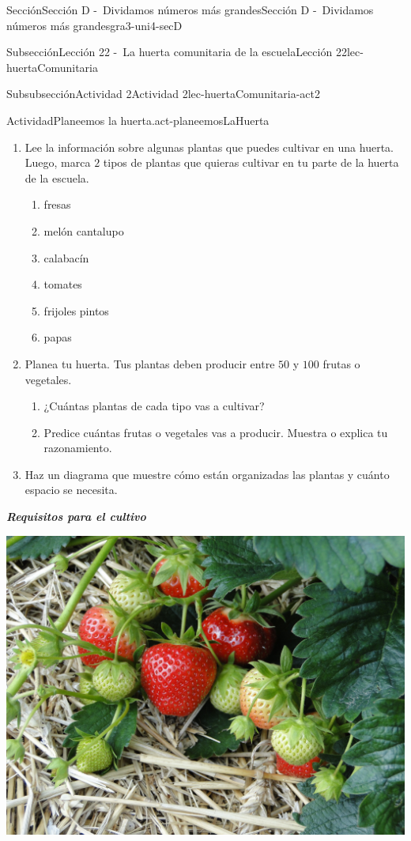 \documentclass[twoside,10pt,]{article}
\newcommand{\alert}[1]{\textbf{\textit{#1}}}
\begin{document}
\begin{sectionptx}{Sección}{Sección D -~Dividamos números más grandes}{}{Sección D -~Dividamos números más grandes}{}{}{gra3-uni4-secD}
\begin{subsectionptx}{Subsección}{Lección 22 -~La huerta comunitaria de la escuela}{}{Lección 22}{}{}{lec-huertaComunitaria}
\begin{subsubsectionptx}{Subsubsección}{Actividad 2}{}{Actividad 2}{}{}{lec-huertaComunitaria-act2}
\begin{activity}{Actividad}{Planeemos la huerta.}{act-planeemosLaHuerta}%
%
\begin{enumerate}
\item{}Lee la información sobre algunas plantas que puedes cultivar en una huerta. Luego, marca \(2\) tipos de plantas que quieras cultivar en tu parte de la huerta de la escuela.%
%
\begin{enumerate}
\item{}fresas%
\item{}melón cantalupo%
\item{}calabacín%
\item{}tomates%
\item{}frijoles pintos%
\item{}papas%
\end{enumerate}
\item{}Planea tu huerta. Tus plantas deben producir entre \(50\) y \(100\) frutas o vegetales.%
%
\begin{enumerate}
\item{}¿Cuántas plantas de cada tipo vas a cultivar?%
\item{}Predice cuántas frutas o vegetales vas a producir. Muestra o explica tu razonamiento.%
\end{enumerate}
\item{}Haz un diagrama que muestre cómo están organizadas las plantas y cuánto espacio se necesita.%
\end{enumerate}
\alert{Requisitos para el cultivo}%
\begin{sidebyside}{2}{0.025}{0.025}{0.05}%
\begin{sbspanel}{0.45}%
\includegraphics[width=\linewidth]{external/jpg-source/3-4-D-22 Act1-Fresas.jpg}

\end{sbspanel}
\end{sidebyside}
\end{activity}
\end{subsubsectionptx}
\end{subsectionptx}
\end{sectionptx}
\end{document}

